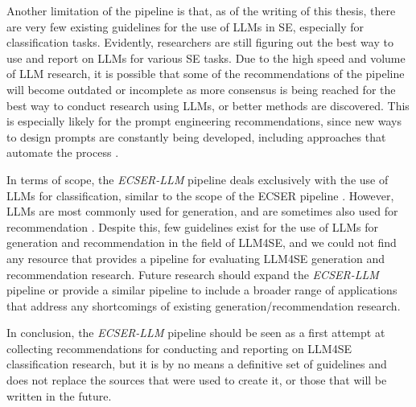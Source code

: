 \documentclass[a4paper]{article}
\newcommand{\newecser}{\textit{ECSER-LLM} }
\begin{document}
Another limitation of the pipeline is that, as of the writing of this thesis, there are very few existing guidelines for the use of LLMs in SE, especially for classification tasks. Evidently, researchers are still figuring out the best way to use and report on LLMs for various SE tasks. Due to the high speed and volume of LLM research, it is possible that some of the recommendations of the pipeline will become outdated or incomplete as more consensus is being reached for the best way to conduct research using LLMs, or better methods are discovered. This is especially likely for the prompt engineering recommendations, since new ways to design prompts are constantly being developed, including approaches that automate the process \cite{zadenoori2025}. 

In terms of scope, the \newecser pipeline deals exclusively with the use of LLMs for classification, similar to the scope of the ECSER pipeline \cite{Dellanna2022}. However, LLMs are most commonly used for generation, and are sometimes also used for recommendation \cite{hou2024}. Despite this, few guidelines exist for the use of LLMs for generation and recommendation in the field of LLM4SE, and we could not find any resource that provides a pipeline for evaluating LLM4SE generation and recommendation research. Future research should expand the \newecser pipeline or provide a similar pipeline to include a broader range of applications that address any shortcomings of existing generation/recommendation research. 

In conclusion, the \newecser pipeline should be seen as a first attempt at collecting recommendations for conducting and reporting on LLM4SE classification research, but it is by no means a definitive set of guidelines and does not replace the sources that were used to create it, or those that will be written in the future.



\newpage 
\printbibliography[heading=bibintoc]
\end{document}
